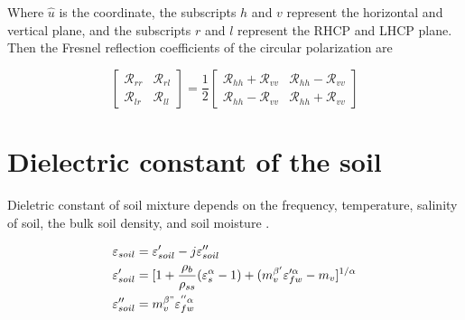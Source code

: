 \documentclass[draftcls]{IEEEtran}
\begin{document}
Where $\hat{u}$ is the coordinate, the subscripts $h$ and $v$ represent the horizontal and vertical plane, and the subscripts $r$ and $l$ represent the RHCP and LHCP plane. Then the Fresnel reflection coefficients of the circular polarization are

\begin{equation}
	\begin{bmatrix}
	\mathcal{R}_{rr} & \mathcal{R}_{rl} \\
	\mathcal{R}_{lr} & \mathcal{R}_{ll}
	\end{bmatrix} = 
	\frac{1}{2}
	\begin{bmatrix}
	\mathcal{R}_{hh} + \mathcal{R}_{vv} & \mathcal{R}_{hh} - \mathcal{R}_{vv} \\
	\mathcal{R}_{hh} - \mathcal{R}_{vv} & \mathcal{R}_{hh} + \mathcal{R}_{vv}		\end{bmatrix}
\end{equation}





\section{Dielectric constant of the soil}
\label{sec:DC_soil}
Dieletric constant of soil mixture depends on the frequency, temperature, salinity of soil, the bulk soil density, and soil moisture \cite{Peplinski:1995,Peplinski_correct:1995}.

\begin{equation} \label{eq: soil_dielectric_main}
\begin{split}
		 { \varepsilon_{soil} } &=  { \varepsilon'_{soil} } -j { \varepsilon''_{soil} } \\
    	 { \varepsilon'_{soil} } &= [1 + \frac{\rho_b}{\rho_{ss}} ( {\varepsilon_{s}^{\alpha}}-1) + (m_v^{\beta'}\varepsilon_{fw}^{\prime\alpha}-m_v]^{1/\alpha} \\
         { \varepsilon''_{soil} } &=m_v^{\beta"}\varepsilon_{fw}^{''\alpha}
\end{split}
\end{equation}
\end{document}
